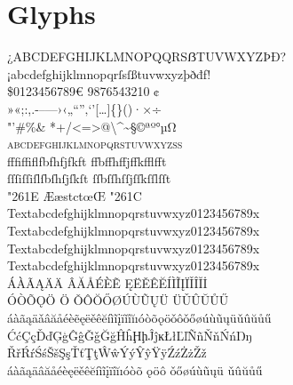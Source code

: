 \documentclass[pagesize,DIV14]{scrartcl}
\begin{document}
\section{Glyphs}
\fontsize{16}{16}
\begin{center}
{
 ¿ABCDEFGHIJKLMNOPQQRSẞTUVWXYZÞÐ?\\
 ¡abcdefghijklmnopqrſsſßtuvwxyzþðđf!\\
 \$0123456789€  %
 {%
  9876543210}%
 ¢\\
 »«;:,.-–—›‹„“”‚‘’[…]\{\}()·×÷\\
 "'\#\%\& *+/<=>@\textbackslash \textasciicircum \textasciitilde §©ªº°µΩ\\
 \textsc{abcdefghijklmnopqrstuvwxyzß}\\
 {
 fffiffiflfbfhfjfkft%
 ffbffhffjffkfflfft\\
 ſſſiſſiſlſbſhſjſkſt%
 ſſbſſhſſjſſkſſlſſt
 }\\
 \char"261E %
 {ÆæstctœŒ}%
 \char"261C\\
 {
 Text{abcdefghijklmnopqrstuvwxyz0123456789}x %
 Text{abcdefghijklmnopqrstuvwxyz0123456789}x\\
 Text{abcdefghijklmnopqrstuvwxyz0123456789}x %
 Text{abcdefghijklmnopqrstuvwxyz0123456789}x}\\
ÁÀÃĄÄ{Ä}%
ÂĂÅÉÈẼ%
ĘËĚÊĔÍÌĨĮÏǏÎĬİ\\
ÓÒÕǪÖ%
{Ö}%
ǑÔŎŐØÚÙŨŲÜ%
{Ü}ǓÛŬŮŰ\\
áàãąäǎâăåéèẽęëěêĕíìĩįïǐîĭıóòõǫöǒôǒőøúùũųüǔûŭůű\\
ĆćÇçĎďĢģĜĝǦǧĞğĤĥḨḩĴĵĸŁłĽľÑñŇňŃńŊŋ\\
ŘřŔŕŚśŠšŞşŤťŢţŴŵÝýŶŷŸÿŹźŻżŽž\\
{%
áàãąäâăåéèęëěêĕíìĩįïîĭıóòõ%
{ǫ}öô%
{ǒ}őøúùũųü%
{ǔ}ûŭůű\\
}}
\end{center}
\end{document}
